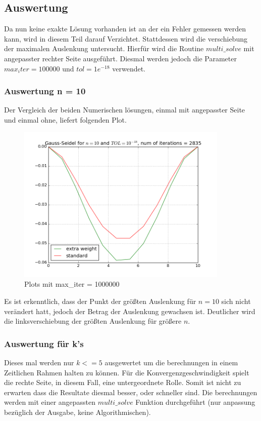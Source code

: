 \documentclass[12pt,titlepage]{article}
\begin{document}
	\subsection{Auswertung}
		Da nun keine exakte Lösung vorhanden ist an der ein Fehler gemessen werden kann, wird in diesem Teil darauf Verzichtet.
		Stattdessen wird die verschiebung der maximalen Auslenkung untersucht. Hierfür wird die Routine $multi\_solve$ mit angepasster rechter Seite
		ausgeführt. Diesmal werden jedoch die Parameter $max_iter=100000$ und $tol=1e^{-18}$ verwendet.
		
		\subsubsection{Auswertung n = 10}
			Der Vergleich der beiden Numerischen lösungen, einmal mit angepasster Seite und einmal ohne, liefert folgenden Plot.
			
		\begin{figure}[H] 
	 		\centering
	 		\includegraphics[width=0.9\textwidth]{bend.png}
	 		\caption{Plots mit max\_iter = 1000000}
	 		\label{fig:Bild5}
	 	\end{figure}
	 	
	 	Es ist erkenntlich, dass der Punkt der größten Auslenkung für $n = 10$ sich nicht verändert hatt, jedoch der Betrag der Auslenkung gewachsen ist.
	 	Deutlicher wird die linksverschiebung der größten Auslenkung für größere $n$.
	 	\newpage
	 	\subsubsection{Auswertung für k's}
	 		Dieses mal werden nur $k<=5$ ausgewertet um die berechnungen in einem Zeitlichen Rahmen halten zu können. Für die Konvergenzgeschwindigkeit spielt die rechte Seite, 
	 		in diesem Fall, eine untergeordnete Rolle. Somit ist nicht zu erwarten dass die Resultate diesmal besser, oder schneller sind. Die berechnungen werden mit einer
	 		angepassten $multi\_solve$ Funktion durchgeführt (nur anpassung bezüglich der Ausgabe, keine Algorithmischen).
\end{document}
